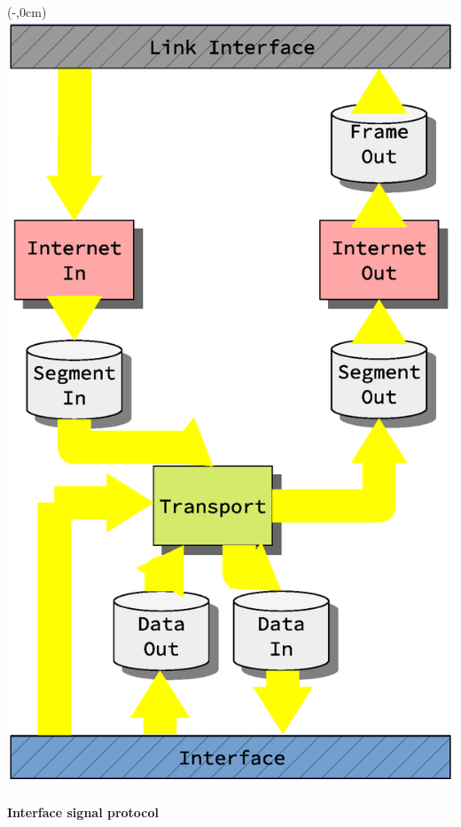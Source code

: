 \begin{frame}[fragile]
\begin{figure}
        \end{figure}
\end{frame}

\begin{frame}[fragile]
    \begin{textblock*}{\displayThumbnail}(\paperwidth-\displayThumbnail-0.2cm,0cm) %
        \colorbox{white}{\includegraphics[width=\textwidth]{implementation/design_2_busses.eps}}
    \end{textblock*}
    \frametitle{\ImplementationTitle}
    \framesubtitle{Interface signal protocol}

\end{frame}
